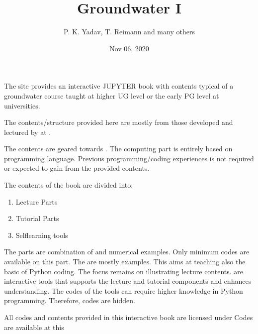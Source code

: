 \documentclass[letterpaper,10pt,english]{sphinxmanual}
\title{Groundwater I}
\date{Nov 06, 2020}
\author{P.\@{} K.\@{} Yadav, T.\@{} Reimann and many others}
\begin{document}
\pagestyle{empty}
\sphinxmaketitle
\pagestyle{plain}
\sphinxtableofcontents
\pagestyle{normal}
\label{\detokenize{intro::doc}}


The site provides an interactive JUPYTER book with contents typical of a  groundwater course taught at higher UG level or the early PG level at universities.

The contents/structure provided here are mostly from those developed and lectured by  at .

The contents are geared towards . The computing part is entirely based on  programming language. Previous programming/coding experiences is not required or expected to gain from the provided contents.

The contents of the book are divided into:
\begin{enumerate}
%
\item {} 
Lecture Parts

\item {} 
Tutorial Parts

\item {} 
Self\sphinxhyphen{}learning tools

\end{enumerate}

The  parts are combination of  and  numerical examples. Only minimum  codes are available on this part.
The  are mostly  examples. This aims at teaching also the basic of Python coding. The focus remains on illustrating lecture contents.  are interactive tools that supports the lecture and tutorial components and enhances understanding. The codes of the tools can require higher knowledge in Python programming. Therefore, codes are hidden.

All codes and contents provided in this interactive book are licensed under 
Codes are available at this 
\begin{quote}

\end{quote}
\end{document}
